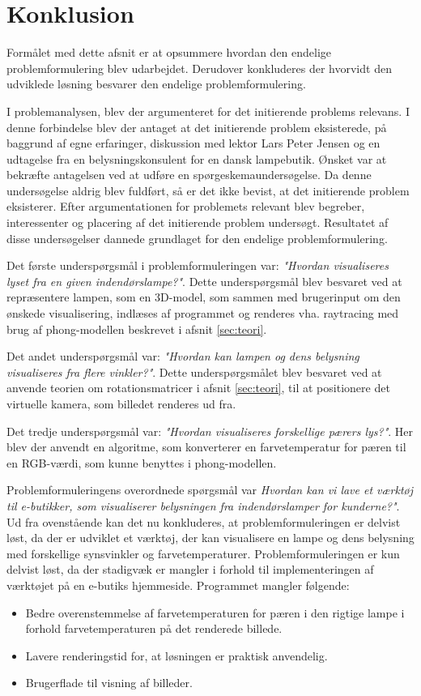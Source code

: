 \section{Konklusion}
Formålet med dette afsnit er at opsummere hvordan den endelige problemformulering blev udarbejdet. Derudover konkluderes der hvorvidt den udviklede løsning besvarer den endelige problemformulering.

I problemanalysen, blev der argumenteret for det initierende problems relevans. I denne forbindelse blev der antaget at det initierende problem eksisterede, på baggrund af egne erfaringer, diskussion med lektor Lars Peter Jensen og en udtagelse fra en belysningskonsulent for en dansk lampebutik. Ønsket var at bekræfte antagelsen ved at udføre en spørgeskemaundersøgelse. Da denne undersøgelse aldrig blev fuldført, så er det ikke bevist, at det initierende problem eksisterer.
Efter argumentationen for problemets relevant blev begreber, interessenter og placering af det initierende problem undersøgt. Resultatet af disse undersøgelser dannede grundlaget for den endelige problemformulering.

Det første underspørgsmål i problemformuleringen var: \textit{"Hvordan visualiseres lyset fra en given indendørslampe?"}. Dette underspørgsmål blev besvaret ved at repræsentere lampen, som en 3D-model, som sammen med brugerinput om den ønskede visualisering, indlæses af programmet og renderes vha. raytracing med brug af phong-modellen beskrevet i afsnit \ref{sec:teori}.

Det andet underspørgsmål var: \textit{"Hvordan kan lampen og dens belysning visualiseres fra flere vinkler?"}. Dette underspørgsmålet blev besvaret ved at anvende teorien om rotationsmatricer i afsnit \ref{sec:teori}, til at positionere det virtuelle kamera, som billedet renderes ud fra.

Det tredje underspørgsmål var: \textit{"Hvordan visualiseres forskellige pærers lys?"}. Her blev der anvendt en algoritme, som konverterer en farvetemperatur for pæren til en RGB-værdi, som kunne benyttes i phong-modellen.

Problemformuleringens overordnede spørgsmål var \textit{Hvordan kan vi lave et værktøj til e-butikker, som visualiserer belysningen fra indendørslamper for kunderne?"}. Ud fra ovenstående kan det nu konkluderes, at problemformuleringen er delvist løst, da der er udviklet et værktøj, der kan visualisere en lampe og dens belysning med forskellige synsvinkler og farvetemperaturer. Problemformuleringen er kun delvist løst, da der stadigvæk er mangler i forhold til implementeringen af værktøjet på en e-butiks hjemmeside. Programmet mangler følgende:

\begin{itemize}
\item Bedre overenstemmelse af farvetemperaturen for pæren i den rigtige lampe i forhold farvetemperaturen på det renderede billede.
\item Lavere renderingstid for, at løsningen er praktisk anvendelig.
\item Brugerflade til visning af billeder.
\end{itemize}

\clearpage